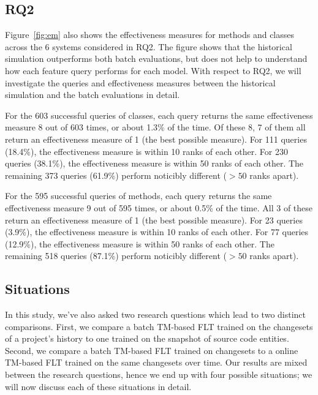 \subsection{RQ2}

Figure~\ref{fig:em} also shows the effectiveness measures for methods and classes
across the 6 systems considered in RQ2. The figure shows that the historical
simulation outperforms both batch evaluations, but does not help to understand
how each feature query performs for each model.  With respect to RQ2, we will
investigate the queries and effectiveness measures between the historical
simulation and the batch evaluations in detail.

For the 603 successful queries of classes,
each query returns the same effectiveness measure 8 out of 603 times, or about 1.3\% of the time.
Of these 8, 7 of them all return an effectiveness measure of 1 (the best possible measure).
For 111 queries (18.4\%), the effectiveness measure is within 10 ranks of each other.
For 230 queries (38.1\%), the effectiveness measure is within 50 ranks of each other.
The remaining 373 queries (61.9\%) perform noticibly different ($> 50$ ranks apart).

For the 595 successful queries of methods,
each query returns the same effectiveness measure 9 out of 595 times, or about 0.5\% of the time.
All 3 of these return an effectiveness measure of 1 (the best possible measure).
For 23 queries (3.9\%), the effectiveness measure is within 10 ranks of each other.
For 77 queries (12.9\%), the effectiveness measure is within 50 ranks of each other.
The remaining 518 queries (87.1\%) perform noticibly different ($> 50$ ranks apart).

\subsection{Situations}


In this study, we've also asked two research questions which lead to two
distinct comparisons.  First, we compare a batch TM-based FLT
trained on the changesets of a project's history to one trained on the snapshot
of source code entities.  Second, we compare a batch TM-based FLT
trained on changesets to a online TM-based FLT trained on the same
changesets over time.  Our results are mixed between the research questions,
hence we end up with four possible situations; we will now discuss each of these
situations in detail.


